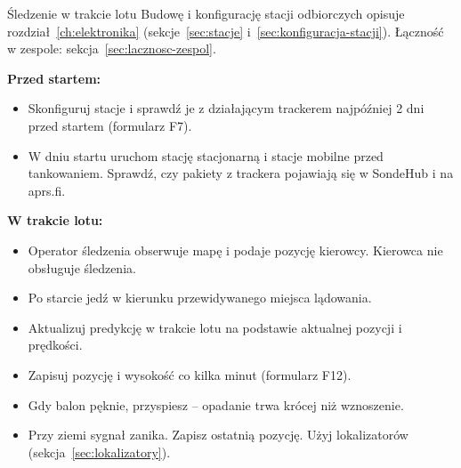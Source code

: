 \begin{sekcja}{Śledzenie w trakcie lotu}\label{sec:sledzenie}
Budowę i konfigurację stacji odbiorczych opisuje rozdział~\ref{ch:elektronika} (sekcje~\ref{sec:stacje} i~\ref{sec:konfiguracja-stacji}). Łączność w zespole: sekcja~\ref{sec:lacznosc-zespol}.

\textbf{Przed startem:}
\begin{itemize}
  \item Skonfiguruj stacje i sprawdź je z działającym trackerem najpóźniej 2 dni przed startem (formularz F7).
  \item W dniu startu uruchom stację stacjonarną i stacje mobilne przed tankowaniem. Sprawdź, czy pakiety z trackera pojawiają się w SondeHub i na aprs.fi.
\end{itemize}

\textbf{W trakcie lotu:}
\begin{itemize}
  \item Operator śledzenia obserwuje mapę i podaje pozycję kierowcy. Kierowca nie obsługuje śledzenia.
  \item Po starcie jedź w kierunku przewidywanego miejsca lądowania.
  \item Aktualizuj predykcję w trakcie lotu na podstawie aktualnej pozycji i prędkości.
  \item Zapisuj pozycję i wysokość co kilka minut (formularz F12).
  \item Gdy balon pęknie, przyspiesz -- opadanie trwa krócej niż wznoszenie.
  \item Przy ziemi sygnał zanika. Zapisz ostatnią pozycję. Użyj lokalizatorów (sekcja~\ref{sec:lokalizatory}).
\end{itemize}

\end{sekcja}

